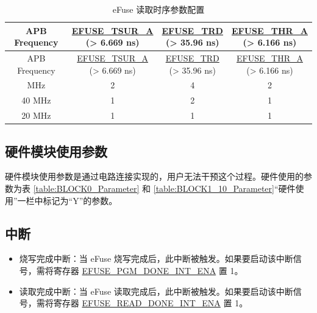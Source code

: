 \documentclass[main\_\_CN.tex]{subfiles}
\begin{document}
\begin{longtable}[c]{ |c|c|c|c|}
    \caption{eFuse 读取时序参数配置}
    \label{table:Read_Timing_Configuration}
    \\\hline
    \rowcolor{lightgray}
    APB Frequency & \makecell[c]{\hyperref[fielddesc:EFUSETSURA]{EFUSE\_TSUR\_A} \\ (> 6.669 ns)} & \makecell[c]{\hyperref[fielddesc:EFUSETRD]{EFUSE\_TRD} \\ (> 35.96 ns)} & \makecell[c]{\hyperref[fielddesc:EFUSETHRA]{EFUSE\_THR\_A} \\ (> 6.166 ns)} \\
    \endfirsthead
    \hline
    \rowcolor{lightgray}
    APB Frequency & \makecell[c]{\hyperref[fielddesc:EFUSETSURA]{EFUSE\_TSUR\_A} \\ (> 6.669 ns)} & \makecell[c]{\hyperref[fielddesc:EFUSETRD]{EFUSE\_TRD} \\ (> 35.96 ns)} & \makecell[c]{\hyperref[fielddesc:EFUSETHRA]{EFUSE\_THR\_A} \\ (> 6.166 ns)} \\
    \endhead
    \endfoot
    \hline
    \endlastfoot
    \hline
    80 MHz & \hexprefix{}2 & \hexprefix{}4 & \hexprefix{}2 \\
    \hline
    40 MHz & \hexprefix{}1 & \hexprefix{}2 & \hexprefix{}1 \\
    \hline
    20 MHz & \hexprefix{}1 & \hexprefix{}1 & \hexprefix{}1 \\
\end{longtable}


\subsection{硬件模块使用参数}

硬件模块使用参数是通过电路连接实现的，用户无法干预这个过程。硬件使用的参数为表 \ref{table:BLOCK0_Parameter} 和 \ref{table:BLOCK1_10_Parameter}“硬件使用”一栏中标记为“Y”的参数。

\subsection{中断}
\begin{itemize}
\item 烧写完成中断：当 eFuse 烧写完成后，此中断被触发。如果要启动该中断信号，需将寄存器 \hyperref[fielddesc:EFUSEPGMDONEINTENA]{EFUSE\_PGM\_DONE\_INT\_ENA} 置 1。
\item 读取完成中断：当 eFuse 读取完成后，此中断被触发。如果要启动该中断信号，需将寄存器 \hyperref[fielddesc:EFUSEREADDONEINTENA]{EFUSE\_READ\_DONE\_INT\_ENA} 置 1。
\end{itemize}
\end{document}
